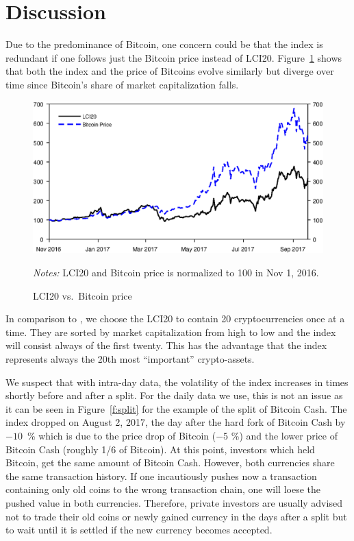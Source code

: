 \documentclass[11pt]{article}
\newcommand\fnotes[1]{\captionsetup{font=scriptsize}\caption*{\textsl{Notes:} #1}}
\begin{document}
\section{Discussion}

 Due to the predominance of Bitcoin, one concern could be that the index is redundant if one follows just the Bitcoin price instead of LCI20.
 Figure~\ref{f:lci20vsBTC} shows that both the index and the price of Bitcoins evolve similarly but diverge over time since Bitcoin's share of market capitalization falls.

 \begin{figure}[p]%
     \centering%
     \caption{LCI20 vs.\ Bitcoin price}\label{f:lci20vsBTC}%
     \includegraphics[width=.8\textwidth]{figs/lci20_vs_btc.eps}%
     \medskip\newline%
     \fnotes{LCI20 and Bitcoin price is normalized to 100 in Nov 1, 2016.}
 \end{figure}

In comparison to \cite{Trimborn2016}, we choose the LCI20 to contain 20 cryptocurrencies once at a time.
They are sorted by market capitalization from high to low and the index will consist always of the first twenty.
This has the advantage that the index represents always the 20th most ``important'' crypto-assets.

We suspect that with intra-day data, the volatility of the index increases in times shortly before and after a split.
For the daily data we use, this is not an issue as it can be seen in Figure~\ref{f:split} for the example of the split of Bitcoin Cash.
The index dropped on August 2, 2017, the day after the hard fork of Bitcoin Cash by $-10$~\% which is due to the price drop of Bitcoin ($-5$ \%) and the lower price of Bitcoin Cash (roughly 1/6 of Bitcoin).
At this point, investors which held Bitcoin, get the same amount of Bitcoin Cash.
However, both currencies share the same transaction history.
If one incautiously pushes now a transaction containing only old coins to the wrong transaction chain, one will loese the pushed value in both currencies.
Therefore, private investors are usually advised not to trade their old coins or newly gained currency in the days after a split but to wait until it is settled if the new currency becomes accepted.
\end{document}
